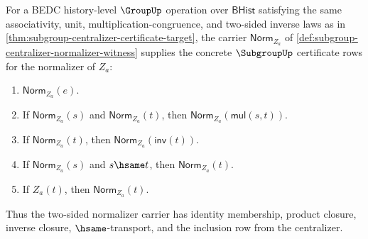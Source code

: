 \begin{theorem}
\label{thm:subgroup-centralizer-normalizer-subgroup-certificate}
For a BEDC history-level $\GroupUp$ operation over $\mathsf{BHist}$ satisfying
the same associativity, unit, multiplication-congruence, and two-sided inverse
laws as in \autoref{thm:subgroup-centralizer-certificate-target}, the carrier
$\mathsf{Norm}_{Z_a}$ of
\autoref{def:subgroup-centralizer-normalizer-witness} supplies the concrete
$\SubgroupUp$ certificate rows for the normalizer of $Z_a$:
\begin{enumerate}
\item $\mathsf{Norm}_{Z_a}(e)$.
\item If $\mathsf{Norm}_{Z_a}(s)$ and $\mathsf{Norm}_{Z_a}(t)$, then
$\mathsf{Norm}_{Z_a}(\mathsf{mul}(s,t))$.
\item If $\mathsf{Norm}_{Z_a}(t)$, then
$\mathsf{Norm}_{Z_a}(\mathsf{inv}(t))$.
\item If $\mathsf{Norm}_{Z_a}(s)$ and $s\hsame t$, then
$\mathsf{Norm}_{Z_a}(t)$.
\item If $Z_a(t)$, then $\mathsf{Norm}_{Z_a}(t)$.
\end{enumerate}
Thus the two-sided normalizer carrier has identity membership, product closure,
inverse closure, $\hsame$-transport, and the inclusion row from the centralizer.
\end{theorem}
